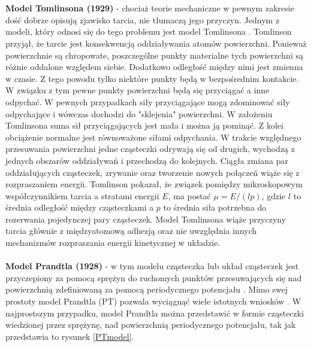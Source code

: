 \documentclass[12pt,a4paper,openright]{report} %
\begin{document}
\\
\\
\textbf{Model Tomlinsona (1929)} - 
chociaż teorie mechaniczne w pewnym zakresie dość dobrze opisują zjawisko tarcia, nie tłumaczą jego przyczyn. Jednym z modeli, który odnosi się do tego problemu jest model Tomlinsona \cite{Janecki, Borys, Tomlinson1929}. Tomlinson przyjął, że tarcie jest konsekwencją oddziaływania atomów powierzchni. Ponieważ powierzchnie są chropowate, poszczególne punkty materialne tych powierzchni są różnie oddalone względem siebie. Dodatkowo odległość między nimi jest zmienna w czasie. Z tego powodu tylko niektóre punkty będą w bezpośrednim kontakcie. W związku z tym pewne punkty powierzchni będą się przyciągać a inne odpychać. W pewnych przypadkach siły przyciągające mogą zdominować siły odpychające i wówczas dochodzi do "sklejenia" powierzchni. W założeniu Tomlinsona suma sił przyciągających jest mała i można ją pominąć. Z kolei obciążenie normalne jest równoważone siłami odpychania. W trakcie względnego przesuwania powierzchni jedne cząsteczki odrywają się od drugich, wychodzą z jednych obszarów oddziaływań i przechodzą do kolejnych. Ciągła zmiana par oddziałujących cząsteczek, zrywanie oraz tworzenie nowych połączeń wiąże się z rozpraszaniem energii. Tomlinson pokazał, że związek pomiędzy mikroskopowym współczynnikiem tarcia a stratami energii $E$, ma postać $\mu = E/(l p)$, gdzie $l$ to średnia odległość między cząsteczkami a $p$ to średnia siła potrzebna do rozerwania pojedynczej pary cząsteczek. Model Tomlinsona wiąże przyczyny tarcia głównie z międzyatomową adhezją oraz nie uwzględnia innych mechanizmów rozpraszania energii kinetycznej w układzie.
\\
\\
\textbf{Model Prandtla (1928)} - w tym modelu cząsteczka lub układ cząsteczek jest przyczepiony za pomocą sprężyn do ruchomych punktów przesuwających się nad powierzchnią zdefiniowaną za pomocą periodycznego potencjału \cite{Prandtl1928}. Mimo swej prostoty model Prandtla (PT) pozwala wyciągnąć wiele istotnych wniosków \cite{SpringerHandbook, Popov2014}. W najprostszym przypadku, model Prandtla można przedstawić w formie cząsteczki wiedzionej przez sprężynę, nad powierzchnią periodycznego potencjału, tak jak przedstawia to rysunek \ref{PTmodel}. 
\end{document}
